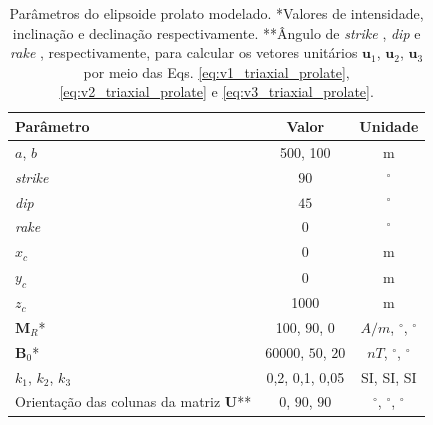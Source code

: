 \begin{table}[h!]
	\begin{center}
		\begin{tabular}{|l|c|c|}
			\hline
			\textbf{Parâmetro}  & \textbf{Valor}  & \textbf{Unidade}\\
			\hline 
			$a$, $b$  & 500, 100 & m\\
			\hline
			\textit{strike}   & $90$ & $^{\circ}$\\
			\hline
			\textit{dip}    & $45$ & $^{\circ}$\\
			\hline
			\textit{rake}   & $0$  & $^{\circ}$\\
			\hline
			$x_c$   & 0  & m\\
			\hline          
			$y_c$   & 0  & m\\
			\hline                
			$z_c$  & 1000  & m\\
			\hline
			$\mathbf{M}_{R}$*  & 100, $90$, $0$  & $A/m$, $^{\circ}$, $^{\circ}$\\
			\hline
			$\mathbf{B}_{0}$*    & 60000, $50$, $20$ & $nT$, $^{\circ}$, $^{\circ}$\\
			\hline
			$k_{1}$, $k_{2}$, $k_{3}$   & 0,2, 0,1, 0,05  & SI, SI, SI\\
			\hline
			Orientação das colunas da matriz $\mathbf{U}$**   & $0$, $90$, $90$  & $^{\circ}$, $^{\circ}$, $^{\circ}$\\
			\hline
		\end{tabular}
		\caption{Parâmetros do elipsoide prolato modelado. *Valores de intensidade, inclinação e declinação respectivamente. **Ângulo de \textit{strike} , \textit{dip}  e \textit{rake} , respectivamente, para calcular os vetores unitários $\mathbf{u}_{1}$, $\mathbf{u}_{2}$, $\mathbf{u}_{3}$ por meio das Eqs. \ref{eq:v1_triaxial_prolate}, \ref{eq:v2_triaxial_prolate} e \ref{eq:v3_triaxial_prolate}.}
	\end{center}
	\label{tab:triaxial_prolate2}
\end{table}

